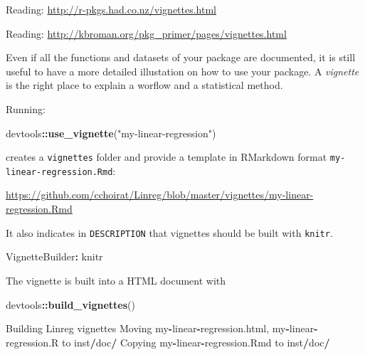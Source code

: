 \documentclass[]{book}
\newenvironment{Shaded}{\begin{snugshade}}{\end{snugshade}}
\newcommand{\KeywordTok}[1]{\textcolor[rgb]{0.13,0.29,0.53}{\textbf{#1}}}
\newcommand{\StringTok}[1]{\textcolor[rgb]{0.31,0.60,0.02}{#1}}
\newcommand{\OperatorTok}[1]{\textcolor[rgb]{0.81,0.36,0.00}{\textbf{#1}}}
\newcommand{\NormalTok}[1]{#1}
\theoremstyle{definition}
\theoremstyle{definition}
\theoremstyle{definition}
\theoremstyle{remark}
\begin{document}
Reading: \url{http://r-pkgs.had.co.nz/vignettes.html}

Reading: \url{http://kbroman.org/pkg_primer/pages/vignettes.html}

Even if all the functions and datasets of your package are documented,
it is still useful to have a more detailed illustation on how to use
your package. A \emph{vignette} is the right place to explain a worflow
and a statistical method.

Running:

\begin{Shaded}
\begin{Highlighting}[]
\NormalTok{devtools}\OperatorTok{::}\KeywordTok{use_vignette}\NormalTok{(}\StringTok{"my-linear-regression"}\NormalTok{)}
\end{Highlighting}
\end{Shaded}

creates a \texttt{vignettes} folder and provide a template in RMarkdown
format \texttt{my-linear-regression.Rmd}:

\url{https://github.com/cchoirat/Linreg/blob/master/vignettes/my-linear-regression.Rmd}

It also indicates in \texttt{DESCRIPTION} that vignettes should be built
with \texttt{knitr}.

\begin{Shaded}
\begin{Highlighting}[]
\NormalTok{VignetteBuilder}\OperatorTok{:}\StringTok{ }\NormalTok{knitr}
\end{Highlighting}
\end{Shaded}

The vignette is built into a HTML document with

\begin{Shaded}
\begin{Highlighting}[]
\NormalTok{devtools}\OperatorTok{::}\KeywordTok{build_vignettes}\NormalTok{()}
\end{Highlighting}
\end{Shaded}

\begin{Shaded}
\begin{Highlighting}[]
\NormalTok{Building Linreg vignettes}
\NormalTok{Moving my}\OperatorTok{-}\NormalTok{linear}\OperatorTok{-}\NormalTok{regression.html, my}\OperatorTok{-}\NormalTok{linear}\OperatorTok{-}\NormalTok{regression.R to inst}\OperatorTok{/}\NormalTok{doc}\OperatorTok{/}
\NormalTok{Copying my}\OperatorTok{-}\NormalTok{linear}\OperatorTok{-}\NormalTok{regression.Rmd to inst}\OperatorTok{/}\NormalTok{doc}\OperatorTok{/}
\end{Highlighting}
\end{Shaded}
\end{document}
